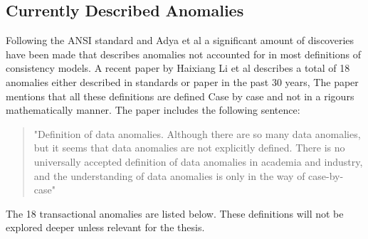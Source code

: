 \documentclass[a4paper,10pt,titlepage]{report}
\begin{document}
\newpage
\subsection{Currently Described Anomalies} %

Following the ANSI standard and Adya et al\cite{Adya99weakconsistency} a significant amount of discoveries have been made that describes anomalies not accounted for in most definitions of consistency models. A recent paper by Haixiang Li et al\cite{li2021coo} describes a total of 18 anomalies either described in standards or paper in the past 30 years, The paper mentions that all these definitions are defined Case by case and not in a rigours mathematically manner. The paper includes the following sentence: 
\begin{quote}
    "Definition of data anomalies. Although there are so many data anomalies, but it seems that data anomalies are not explicitly defined. There is no universally accepted definition of data anomalies in academia and industry, and the understanding of data anomalies is only in the way of case-by-case" \cite{li2021coo}
\end{quote}

The 18 transactional anomalies are listed below. These definitions will not be explored deeper unless relevant for the thesis.
\end{document}
